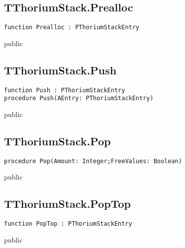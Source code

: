 \subsection{TThoriumStack.Prealloc}
\label{thoriumcore:thorium:tthoriumstack:prealloc}
\begin{FPCList}
\Synopsis
\Declaration 

\begin{verbatim}
function Prealloc : PThoriumStackEntry
\end{verbatim}
\Visibility
public
\Description
\Errors
\end{FPCList}
\subsection{TThoriumStack.Push}
\label{thoriumcore:thorium:tthoriumstack:push}
\begin{FPCList}
\Synopsis
\Declaration 

\begin{verbatim}
function Push : PThoriumStackEntry
procedure Push(AEntry: PThoriumStackEntry)
\end{verbatim}
\Visibility
public
\Description
\Errors
\end{FPCList}
\subsection{TThoriumStack.Pop}
\label{thoriumcore:thorium:tthoriumstack:pop}
\begin{FPCList}
\Synopsis
\Declaration 

\begin{verbatim}
procedure Pop(Amount: Integer;FreeValues: Boolean)
\end{verbatim}
\Visibility
public
\Description
\Errors
\end{FPCList}
\subsection{TThoriumStack.PopTop}
\label{thoriumcore:thorium:tthoriumstack:poptop}
\begin{FPCList}
\Synopsis
\Declaration 

\begin{verbatim}
function PopTop : PThoriumStackEntry
\end{verbatim}
\Visibility
public
\Description
\Errors
\end{FPCList}
